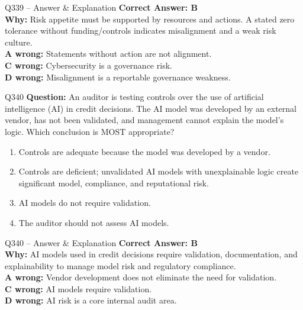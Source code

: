 \documentclass[aspectratio=169,10pt]{beamer}
\begin{document}
	\begin{frame}[t]{Q339 -- Answer \& Explanation}
		\small
		\textbf{Correct Answer: B} \\[4pt]
		\textbf{Why:} Risk appetite must be supported by resources and actions. A stated zero tolerance without funding/controls indicates misalignment and a weak risk culture. \\[4pt]
		\textbf{A wrong:} Statements without action are not alignment. \\[2pt]
		\textbf{C wrong:} Cybersecurity is a governance risk. \\[2pt]
		\textbf{D wrong:} Misalignment is a reportable governance weakness.
	\end{frame}
	
	\begin{frame}[t]{Q340}
		\small
		\textbf{Question:} An auditor is testing controls over the use of artificial intelligence (AI) in credit decisions. The AI model was developed by an external vendor, has not been validated, and management cannot explain the model's logic. Which conclusion is MOST appropriate?
		\begin{enumerate}[label=\Alph*.,itemsep=1pt,topsep=2pt]
			\item Controls are adequate because the model was developed by a vendor.
			\item Controls are deficient; unvalidated AI models with unexplainable logic create significant model, compliance, and reputational risk.
			\item AI models do not require validation.
			\item The auditor should not assess AI models.
		\end{enumerate}
	\end{frame}
	
	\begin{frame}[t]{Q340 -- Answer \& Explanation}
		\small
		\textbf{Correct Answer: B} \\[4pt]
		\textbf{Why:} AI models used in credit decisions require validation, documentation, and explainability to manage model risk and regulatory compliance. \\[4pt]
		\textbf{A wrong:} Vendor development does not eliminate the need for validation. \\[2pt]
		\textbf{C wrong:} AI models require validation. \\[2pt]
		\textbf{D wrong:} AI risk is a core internal audit area.
	\end{frame}
	
\end{document}
